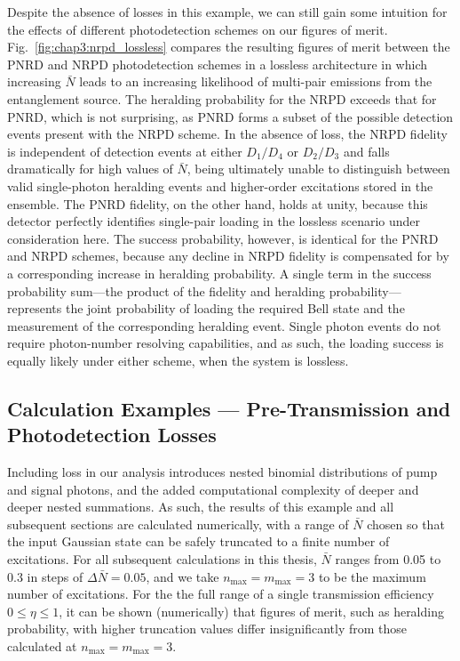 \documentclass[aps,twocolumn,secnumarabic,amsmath,amssymb,pra,groupedaddress,
showpacs, showkeys]{revtex4-1}
\begin{document}
Despite the absence of losses in this example, we can still gain some intuition
for the effects of different photodetection schemes on our figures of
merit. Fig.~\ref{fig:chap3:nrpd_lossless} compares the resulting figures of
merit between the PNRD and NRPD photodetection schemes in a lossless
architecture in which increasing $\bar{N}$ leads to an increasing likelihood of
multi-pair emissions from the entanglement source. The heralding probability
for the NRPD exceeds that for PNRD, which is not surprising, as PNRD forms a
subset of the possible detection events present with the NRPD scheme. In the
absence of loss, the NRPD fidelity is independent of detection events at either
$D_{1}/D_{4}$ or $D_{2}/D_{3}$ and falls dramatically for high values of
$\bar{N}$, being ultimately unable to distinguish between valid single-photon
heralding events and higher-order excitations stored in the ensemble. The PNRD
fidelity, on the other hand, holds at unity, because this detector perfectly
identifies single-pair loading in the lossless scenario under consideration
here. The success probability, however, is identical for the PNRD and NRPD
schemes, because any decline in NRPD fidelity is compensated for by a
corresponding increase in heralding probability. A single term in the success
probability sum---the product of the fidelity and heralding
probability---represents the joint probability of loading the required Bell
state and the measurement of the corresponding heralding event. Single photon
events do not require photon-number resolving capabilities, and as such, the
loading success is equally likely under either scheme, when the system is
lossless.

\subsection{Calculation Examples --- Pre-Transmission and Photodetection
  Losses\label{sec:example:two}}

Including loss in our analysis introduces nested binomial distributions of pump
and signal photons, and the added computational complexity of deeper and deeper
nested summations. As such, the results of this example and all subsequent
sections are calculated numerically, with a range of $\bar{N}$ chosen so that
the input Gaussian state can be safely truncated to a finite number of
excitations. For all subsequent calculations in this thesis, $\bar{N}$ ranges
from 0.05 to 0.3 in steps of $\Delta \bar{N}=0.05$, and we take
$n_{\textrm{max}}=m_{\textrm{max}}=3$ to be the maximum number of
excitations. For the the full range of a single transmission efficiency $ 0
\leq \eta \leq 1$, it can be shown (numerically) that figures of merit, such as
heralding probability, with higher truncation values differ insignificantly
from those calculated at $n_{\textrm{max}}=m_{\textrm{max}}=3$. 
\end{document}
